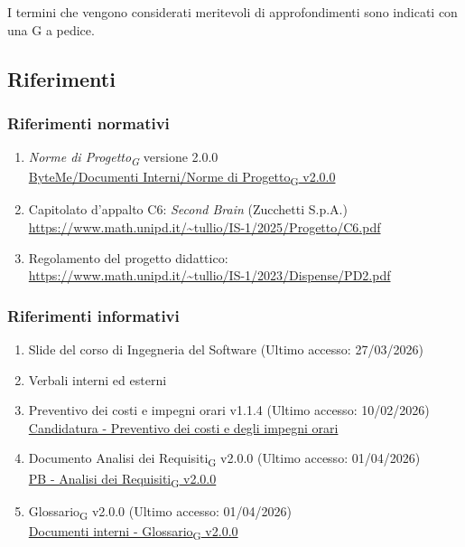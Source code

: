 \documentclass[11pt,a4paper]{article}
\newcommand{\gls}[1]{#1\textsubscript{G}}
\begin{document}
I termini che vengono considerati meritevoli di approfondimenti sono indicati con una G a pedice.

\subsection{Riferimenti}
\subsubsection{Riferimenti normativi}
\begin{enumerate}
  \item \textit{\gls{Norme di Progetto}} versione 2.0.0\\
  \href{https://byteme25.github.io/ByteMe/files.html}{ByteMe/Documenti Interni/\gls{Norme di Progetto} v2.0.0}
  \item Capitolato d'appalto C6: \textit{Second Brain} (Zucchetti S.p.A.)\\ \url{https://www.math.unipd.it/~tullio/IS-1/2025/Progetto/C6.pdf}
  \item Regolamento del progetto didattico:\\
        \url{https://www.math.unipd.it/~tullio/IS-1/2023/Dispense/PD2.pdf}
\end{enumerate}

\subsubsection{Riferimenti informativi}
\begin{enumerate}
    \item Slide del corso di Ingegneria del Software (Ultimo accesso: 27/03/2026)
    \item Verbali interni ed esterni
    \item Preventivo dei costi e impegni orari v1.1.4 (Ultimo accesso: 10/02/2026)\\
    \href{https://byteme25.github.io/ByteMe/}{Candidatura - Preventivo dei costi e degli impegni orari}
    \item Documento \gls{Analisi dei Requisiti} v2.0.0 (Ultimo accesso: 01/04/2026)\\
    \href{https://byteme25.github.io/ByteMe/}{PB - \gls{Analisi dei Requisiti} v2.0.0}
    \item \gls{Glossario} v2.0.0 (Ultimo accesso: 01/04/2026)\\
    \href{https://byteme25.github.io/ByteMe/files.html}{Documenti interni - \gls{Glossario} v2.0.0}
\end{enumerate}
\end{document}
